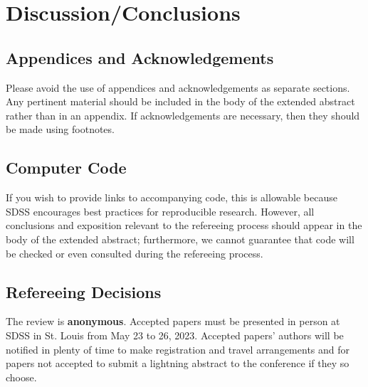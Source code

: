 \documentclass[10pt]{article}
\begin{document}
\section{Discussion/Conclusions}

\subsection{Appendices and Acknowledgements}

Please avoid the use of appendices and acknowledgements 
as separate sections.  Any pertinent material should be included in the
body of the extended abstract rather than in an appendix.  If 
acknowledgements are necessary, then they should be made using footnotes.

\subsection{Computer Code}

If you wish to provide links to accompanying code, this is allowable because
SDSS encourages best practices for reproducible research.  However, all
conclusions and exposition relevant to the refereeing process should appear in
the body of the extended abstract; furthermore, we cannot guarantee that 
code will be checked or even consulted during the refereeing process.

\subsection{Refereeing Decisions}
The review is \textbf{anonymous}. Accepted papers must be presented in person at SDSS in St. Louis 
from May 23 to 26, 2023.
Accepted papers' authors will be notified in plenty of time to make registration and travel 
arrangements and for papers not accepted to submit a lightning abstract to the 
conference if they so choose.


\end{document}
